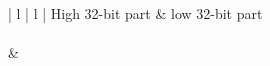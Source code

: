 \begin{center}
\begin{tabular}{ | l | l | }
\hline
	High 32-bit part & low 32-bit part \\
\hline
{} \\
\hline
{} &  \\
\hline
\end{tabular}
\end{center}
